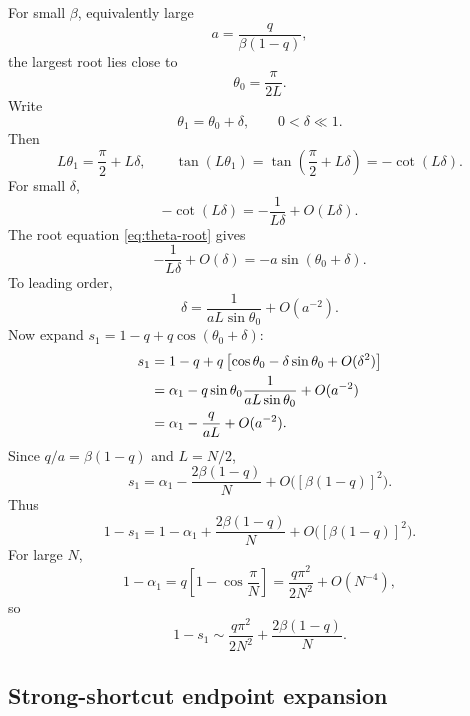 \documentclass[11pt]{article}
\begin{document}
For small $\beta$, equivalently large
\begin{equation}
  a=\frac{q}{\beta(1-q)},
\end{equation}
the largest root lies close to
\begin{equation}
  \theta_0=\frac{\pi}{2L}.
\end{equation}
Write
\begin{equation}
  \theta_1=\theta_0+\delta,
  \qquad 0<\delta\ll1.
\end{equation}
Then
\begin{equation}
  L\theta_1=\frac{\pi}{2}+L\delta,
  \qquad
  \tan(L\theta_1)=\tan\left(\frac\pi2+L\delta\right)
  =-\cot(L\delta).
\end{equation}
For small $\delta$,
\begin{equation}
  -\cot(L\delta)=-\frac{1}{L\delta}+O(L\delta).
\end{equation}
The root equation \eqref{eq:theta-root} gives
\begin{equation}
  -\frac{1}{L\delta}+O(\delta)=-a\sin(\theta_0+\delta).
\end{equation}
To leading order,
\begin{equation}
  \delta=\frac{1}{aL\sin\theta_0}+O(a^{-2}).
\end{equation}
Now expand $s_1=1-q+q\cos(\theta_0+\delta)$:
\begin{align}
  s_1
  &=1-q+q\left[\cos\theta_0-\delta\sin\theta_0+O(\delta^2)\right]\notag\\
  &=\alpha_1-q\sin\theta_0\frac{1}{aL\sin\theta_0}+O(a^{-2})\notag\\
  &=\alpha_1-\frac{q}{aL}+O(a^{-2}).
\end{align}
Since $q/a=\beta(1-q)$ and $L=N/2$,
\begin{equation}
  \boxed{s_1=\alpha_1-\frac{2\beta(1-q)}{N}
  +O\bigl([\beta(1-q)]^2\bigr).}
\end{equation}
Thus
\begin{equation}
  \boxed{1-s_1=1-\alpha_1+\frac{2\beta(1-q)}{N}
  +O\bigl([\beta(1-q)]^2\bigr).}
\end{equation}
For large $N$,
\begin{equation}
  1-\alpha_1=q\left[1-\cos\frac{\pi}{N}\right]
  =\frac{q\pi^2}{2N^2}+O(N^{-4}),
\end{equation}
so
\begin{equation}
  \boxed{1-s_1\sim \frac{q\pi^2}{2N^2}+\frac{2\beta(1-q)}{N}.}
\end{equation}

\subsection{Strong-shortcut endpoint expansion}
\end{document}
